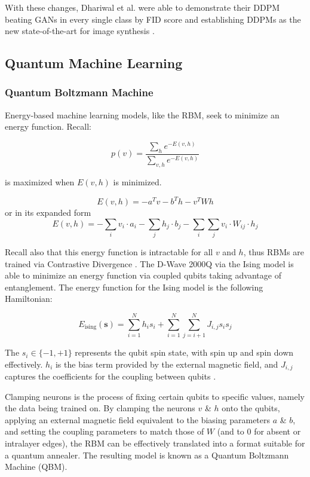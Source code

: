 \documentclass[%
 reprint,
 amsmath,amssymb,
 aps,
]{revtex4-2}
\begin{document}
With these changes, Dhariwal et al. were able to demonstrate their DDPM beating GANs in every single class by FID score and establishing DDPMs as the new state-of-the-art for image synthesis  \cite{dhariwal2021diffusion}.

\subsection{Quantum Machine Learning}
\subsubsection{Quantum Boltzmann Machine}
Energy-based machine learning models, like the RBM, seek to minimize an energy function. Recall:

\begin{equation}
p(v) = \frac{\sum_{h} e^{-E(v,h)}}{\sum_{v,h}e^{-E(v,h)}}
\end{equation}


is maximized when $E(v,h)$ is minimized.

\begin{equation}
E(v, h) = -a^Tv -b^Th -v^TWh
\end{equation}
or in its expanded form
\begin{equation}
E(v, h) = - \sum_{i} v_i \cdot a_i - \sum_{j} h_j \cdot b_j - \sum_{i} \sum_{j} v_i \cdot W_{ij} \cdot h_j
\end{equation}



Recall also that this energy function is intractable for all $v$ and $h$, thus RBMs are trained via Contrastive Divergence \cite{trainingrbms}. The D-Wave 2000Q  via the Ising model is able to minimize an energy function via coupled qubits taking advantage of entanglement. The energy function for the Ising model is the following Hamiltonian:

\begin{equation}
E_{\text{ising}}(\mathbf{s}) = \sum_{i=1}^N h_i s_i + \sum_{i=1}^N \sum_{j=i+1}^N J_{i,j} s_i s_j
\end{equation}



The $s_i \in \{-1, +1\}$ represents the qubit spin state, with spin up and spin down effectively. $h_i$ is the bias term provided by the external magnetic field, and $J_{i,j}$ captures the coefficients for the coupling between qubits \cite{dwavedocs}.


Clamping neurons is the process of fixing certain qubits to specific values, namely the data being trained on. By clamping the neurons $v$ \& $h$ onto the qubits, applying an external magnetic field equivalent to the biasing parameters $a$ \& $b$, and setting the coupling parameters to match those of $W$ (and to 0 for absent or intralayer edges), the RBM can be effectively translated into a format suitable for a quantum annealer. The resulting model is known as a Quantum Boltzmann Machine (QBM)\cite{dwavedocs}.
\end{document}
